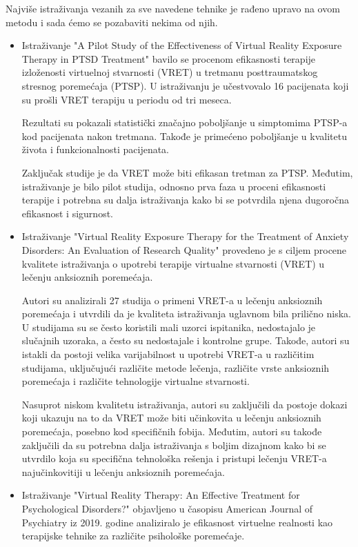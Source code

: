 \documentclass[a4paper]{article}
\begin{document}
Najviše istraživanja vezanih za sve navedene tehnike je rađeno upravo na ovom metodu i sada ćemo se pozabaviti nekima od njih.
\begin{itemize} 
\item Istraživanje "A Pilot Study of the Effectiveness of Virtual Reality Exposure Therapy in PTSD Treatment" \cite{jedanaest} bavilo se procenom efikasnosti terapije izloženosti virtuelnoj stvarnosti (VRET) u tretmanu posttraumatskog stresnog poremećaja (PTSP). U istraživanju je učestvovalo 16 pacijenata koji su prošli VRET terapiju u periodu od tri meseca.

Rezultati su pokazali statistički značajno poboljšanje u simptomima PTSP-a kod pacijenata nakon tretmana. Takođe je primećeno poboljšanje u kvalitetu života i funkcionalnosti pacijenata.

Zaključak studije je da VRET može biti efikasan tretman za PTSP. Međutim, istraživanje je bilo pilot studija, odnosno prva faza u proceni efikasnosti terapije i potrebna su dalja istraživanja kako bi se potvrdila njena dugoročna efikasnost i sigurnost.

\item Istraživanje "Virtual Reality Exposure Therapy for the Treatment of Anxiety Disorders: An Evaluation of Research Quality"\cite{dvanaest} provedeno je s ciljem procene kvalitete istraživanja o upotrebi terapije virtualne stvarnosti (VRET) u lečenju anksioznih poremećaja.

Autori su analizirali 27 studija o primeni VRET-a u lečenju anksioznih poremećaja i utvrdili da je kvaliteta istraživanja uglavnom bila prilično niska. U studijama su se često koristili mali uzorci ispitanika, nedostajalo je slučajnih uzoraka, a često su nedostajale i kontrolne grupe. Takođe, autori su istakli da postoji velika varijabilnost u upotrebi VRET-a u različitim studijama, uključujući različite metode lečenja, različite vrste anksioznih poremećaja i različite tehnologije virtualne stvarnosti.

Nasuprot niskom kvalitetu istraživanja, autori su zaključili da postoje dokazi koji ukazuju na to da VRET može biti učinkovita u lečenju anksioznih poremećaja, posebno kod specifičnih fobija. Međutim, autori su takođe zaključili da su potrebna dalja istraživanja s boljim dizajnom kako bi se utvrdilo koja su specifična tehnološka rešenja i pristupi lečenju VRET-a najučinkovitiji u lečenju anksioznih poremećaja.

\item Istraživanje "Virtual Reality Therapy: An Effective Treatment for Psychological Disorders?"\cite{trinaest} objavljeno u časopisu American Journal of Psychiatry iz 2019. godine analiziralo je efikasnost virtuelne realnosti kao terapijske tehnike za različite psihološke poremećaje.


\end{itemize}
\end{document}
